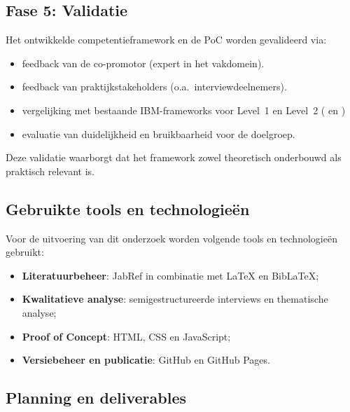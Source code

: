 \subsection{Fase 5: Validatie}

Het ontwikkelde competentieframework en de PoC worden gevalideerd via:
\begin{itemize}
	\item feedback van de co-promotor (expert in het vakdomein).
	\item feedback van praktijkstakeholders (o.a.\ interviewdeelnemers).
	\item vergelijking met bestaande IBM-frameworks voor Level~1 en Level~2 (\autocite{IBMZSysAdminLevel1} en \autocite{IBMZSysAdminLevel2})
	\item evaluatie van duidelijkheid en bruikbaarheid voor de doelgroep.
\end{itemize}

Deze validatie waarborgt dat het framework zowel theoretisch onderbouwd als praktisch relevant is.

\subsection{Gebruikte tools en technologieën}

Voor de uitvoering van dit onderzoek worden volgende tools en technologieën gebruikt:
\begin{itemize}
	\item \textbf{Literatuurbeheer}: JabRef in combinatie met \LaTeX{} en Bib\LaTeX{};
	\item \textbf{Kwalitatieve analyse}: semigestructureerde interviews en thematische analyse;
	\item \textbf{Proof of Concept}: HTML, CSS en JavaScript;
	\item \textbf{Versiebeheer en publicatie}: GitHub en GitHub Pages.
\end{itemize}

\subsection{Planning en deliverables}

